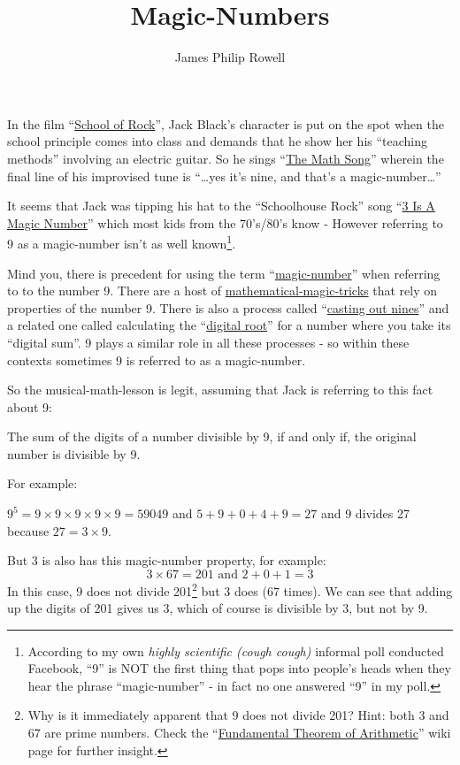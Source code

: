 \documentclass{article}
\title{Magic-Numbers}
\author{James Philip Rowell}
\newenvironment{jprIn}{\begin{adjustwidth}{2em}{}}{\end{adjustwidth}}
\begin{document}
\maketitle

In the film ``\href{https://en.wikipedia.org/wiki/School_of_Rock}{School
of Rock}'', Jack Black's character is put on the spot when
the school principle comes into class and demands that he show
her his ``teaching methods'' involving an electric guitar.
So he sings ``\href{https://www.youtube.com/watch?v=aa8U0nL-KXg}{The
Math Song}'' wherein the final line of his
improvised tune is ``\dots{}yes it's nine, and that's a magic-number\dots{}''

It seems that Jack was tipping his hat
to the ``Schoolhouse Rock'' song ``\href{https://youtu.be/aU4pyiB-kq0}{3
Is A Magic Number}''
which most kids from the 70's/80's know -
However referring to 9 as a magic-number isn't
as well known\footnote{According to my own \emph{highly scientific (cough cough)}
informal poll conducted Facebook, %
``9'' is NOT the first thing that pops into people's heads when they
hear the phrase ``magic-number'' - in fact no one answered ``9'' in my poll.}.

Mind you, there is precedent
for using the term ``\href{http://mathworld.wolfram.com/MagicNumber.html}{magic-number}''
when referring to to the number 9.
There are a host of
\href{http://mathematics-in-europe.eu/?p=144}{mathematical-magic-tricks}
that rely on properties of the number 9.
There is also a process called
``\href{https://en.wikipedia.org/wiki/Casting_out_nines}{casting out nines}'' and a related one 
called calculating the
``\href{http://mathworld.wolfram.com/DigitalRoot.html}{digital root}''
for a number where you take its ``digital sum''. 9 plays a similar role
in all these processes - so within these contexts sometimes 9
is referred to as a magic-number.

So the musical-math-lesson is legit, assuming that Jack is referring to this fact about 9:
\begin{center}
The sum of the digits of a number divisible by 9,
\break
if and only if,
\break
the original number
is divisible by 9.
\end{center}

For example:
\begin{jprIn}
$9^5=9\times{}9\times{}9\times{}9\times{}9=59049$
and $5+9+0+4+9=27$ and 9 divides 27 because $27 = 3\times{}9$.
\end{jprIn}

But 3 is also has this magic-number property, for example:
\[ 3\times{}67=201 \text{ and } 2+0+1=3\]
In this case, 9 does not divide 201\footnote{Why is it immediately
apparent that 9 does not divide 201? Hint: both 3 and 67 are prime numbers.
Check the ``\href{https://en.wikipedia.org/wiki/Fundamental_theorem_of_arithmetic}{Fundamental
Theorem of Arithmetic}'' wiki page for further insight.}
but 3 does (67 times).
We can see that adding up the digits of 201 gives us 3,
which of course is divisible by 3, but not by 9.
\end{document}
